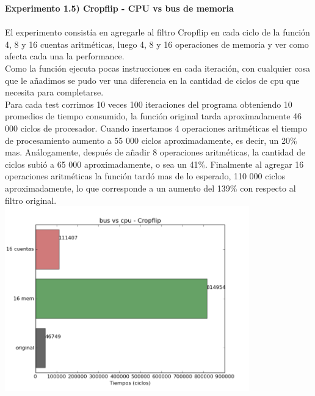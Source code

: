 \documentclass[a4paper]{article}
\begin{document}
\textbf{Experimento 1.5) Cropflip - CPU vs bus de memoria}\\ \\
El experimento consistía en agregarle al filtro Cropflip en cada ciclo de la funci\'{o}n  4, 8 y 16 cuentas aritméticas, luego 4, 8 y 16 operaciones de memoria y ver como afecta cada una la performance. \\
Como la funci\'{o}n ejecuta pocas instrucciones en cada iteraci\'{o}n, con cualquier cosa que le añadimos se pudo ver una diferencia en la cantidad de ciclos de cpu que necesita para completarse. \\
Para cada test corrimos 10 veces 100 iteraciones del programa obteniendo 10 promedios de tiempo consumido, la funci\'{o}n original tarda aproximadamente 46 000 ciclos de procesador. Cuando insertamos 4 operaciones aritméticas el tiempo de procesamiento aumento a 55 000 ciclos aproximadamente, es decir, un 20\% mas. An\'{a}logamente, después de añadir 8 operaciones aritméticas, la cantidad de ciclos subi\'{o} a 65 000 aproximadamente, o sea un 41\%. Finalmente al agregar 16 operaciones aritméticas la funci\'{o}n tard\'{o} mas de lo esperado, 110 000 ciclos aproximadamente, lo que corresponde a un aumento del 139\% con respecto al filtro original. \\

\includegraphics[width=300pt]{imagenes/bvmcrop.png}
\end{document}
